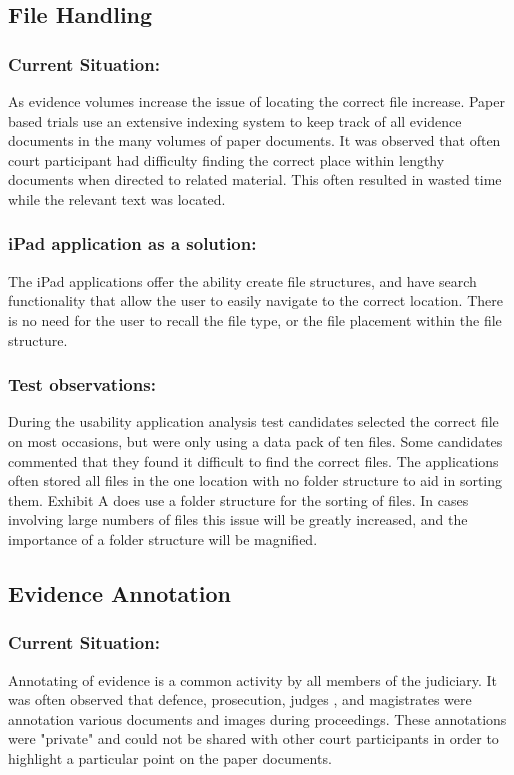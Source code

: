 \subsection{File Handling}
\subsubsection{Current Situation:}
As evidence volumes increase the issue of locating the correct file increase. Paper based trials use an extensive indexing system to keep track of all evidence documents in the many volumes of paper documents. It was observed that often court participant had difficulty finding the correct place within lengthy documents when directed to related material. This often resulted in wasted time while the relevant text was located.\\
\subsubsection{iPad application as a solution:}
The iPad applications offer the ability create file structures, and have search functionality that allow the user to easily navigate to the correct location. There is no need for the user to recall the file type, or the file placement within the file structure.\\

\subsubsection{Test observations:}
During the usability application analysis test candidates selected the correct file on most occasions, but were only using a data pack of ten files. Some candidates commented that they found it difficult to find the correct files. The applications often stored all files in the one location with no folder structure to aid in sorting them. Exhibit A does use a folder structure for the sorting of files. In cases involving large numbers of files this issue will be greatly increased, and the importance of a folder structure will be magnified.\\


\subsection{Evidence Annotation}
\subsubsection{Current Situation:}
Annotating of evidence is a common activity by all members of the judiciary. It was often observed that defence, prosecution, judges , and magistrates were annotation various documents and images during proceedings. These annotations were "private" and could not be shared with other court participants in order to highlight a particular point on the paper documents.
\\
